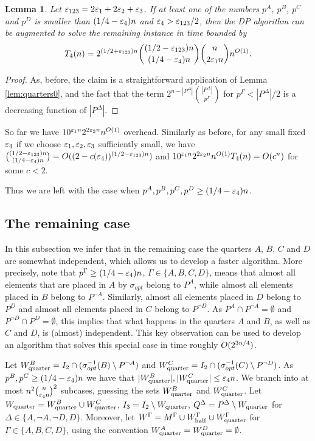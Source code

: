 \documentclass{article}
\newtheorem{lemma}[theorem]{Lemma}
\theoremstyle{definition}
\begin{document}
\begin{lemma}\label{lem:quarters2}
Let $\varepsilon_{123} = 2\varepsilon_1 + 2\varepsilon_2 + \varepsilon_3$.
If at least one of the numbers $p^A$, $p^B$, $p^C$ and $p^D$ is smaller than $(1/4-\varepsilon_4)n$ and $\varepsilon_4 > \varepsilon_{123}/2$,
then the DP algorithm can be augmented to solve the remaining instance in time bounded by
$$T_4(n) = 2^{(1/2+\varepsilon_{123})n} \binom{(1/2-\varepsilon_{123})n}{(1/4-\varepsilon_4)n} \binom{n}{2\varepsilon_1 n} n^{O(1)}.$$
\end{lemma}
\begin{proof}
As, before, the claim is a straightforward application of Lemma \ref{lem:quarters0}, and the fact that the term $2^{n-|P^\Delta|} \binom{|P^\Delta|}{p^\Gamma}$ for $p^\Gamma < |P^\Delta|/2$ is a decreasing function of $|P^\Delta|$.
\end{proof}

So far we have $10^{\varepsilon_1 n} 2^{2\varepsilon_2 n} n^{O(1)}$ overhead. Similarly as before, for any small fixed $\varepsilon_4$ if we choose $\varepsilon_1, \varepsilon_2, \varepsilon_3$ sufficiently small, we have $\binom{(1/2-\varepsilon_{123})n}{(1/4-\varepsilon_4)n} = O((2-c(\varepsilon_4))^{(1/2-\varepsilon_{123})n})$
and $10^{\varepsilon_1 n} 2^{2\varepsilon_2 n} n^{O(1)}T_4(n) = O(c^n)$ for some $c<2$. 

Thus we are left with the case when $p^A,p^B,p^C,p^D \geq (1/4-\varepsilon_4)n$.

\subsection{The remaining case}\label{sec:finish}

In this subsection we infer that in the remaining case the quarters $A$, $B$, $C$ and $D$ are somewhat independent, which allows us to develop a faster algorithm. More precisely, note that $p^\Gamma \geq (1/4 - \varepsilon_4)n$, $\Gamma \in \{A,B,C,D\}$, means that
almost all elements that are placed in $A$ by $\sigma_{opt}$ belong to $P^A$, while almost all elements placed in $B$ belong to $P^{\neg A}$. Similarly, almost all elements placed in $D$ belong to $P^D$ and almost all elements placed in $C$ belong to $P^{\neg D}$.
As $P^A \cap P^{\neg A} = \emptyset$ and $P^{\neg D} \cap P^D = \emptyset$, this implies that what happens in the quarters $A$ and $B$, as well as $C$ and $D$, is (almost) independent. This key observation can be used to develop an algorithm that solves this special case in time roughly $O(2^{3n/4})$.

Let $W_{\mathrm{quarter}}^B = I_2 \cap (\sigma_{opt}^{-1}(B) \setminus P^{\neg A})$ and $W_{\mathrm{quarter}}^C = I_2 \cap (\sigma_{opt}^{-1}(C) \setminus P^{\neg D})$.
As $p^B, p^C \geq (1/4-\varepsilon_4)n$ we have that $|W_{\mathrm{quarter}}^B|,|W_{\mathrm{quarter}}^C| \leq \varepsilon_4 n$.
We branch into at most $n^{2} \binom{n}{\varepsilon_4 n}^2$ subcases, guessing the sets $W_{\mathrm{quarter}}^B$ and $W_{\mathrm{quarter}}^C$.
Let $W_{\mathrm{quarter}} = W_{\mathrm{quarter}}^B \cup W_{\mathrm{quarter}}^C$, $I_3 = I_2 \setminus W_{\mathrm{quarter}}$, $Q^\Delta = P^\Delta \setminus W_{\mathrm{quarter}}$ for $\Delta \in \{A,\neg A,\neg D,D\}$.
Moreover, let $W^\Gamma = M^\Gamma \cup W_{\mathrm{half}}^\Gamma \cup W_{\mathrm{quarter}}^\Gamma$ for $\Gamma \in \{A,B,C,D\}$, using the convention $W_{\mathrm{quarter}}^A = W_{\mathrm{quarter}}^D = \emptyset$.
\end{document}
